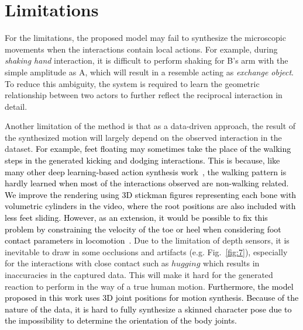 \documentclass[times,twocolumn,final]{elsarticle}
\begin{document}
\section{Limitations}
\label{sec:limitation}
For the limitations, the proposed model may fail to synthesize the microscopic movements when the interactions contain local actions. For example, during \emph{shaking hand} interaction, it is difficult to perform shaking for B's arm with the simple amplitude as A, which will result in a resemble acting as \emph{exchange object}. To reduce this ambiguity, the system is required to learn the geometric relationship between two actors to further reflect the reciprocal interaction in detail.

Another limitation of the method is that as a data-driven approach, the result of the synthesized motion will largely depend on the observed interaction in the dataset. \textcolor{black}{For example, feet floating may sometimes take the place of the walking steps in the generated kicking and dodging interactions. This is because, like many other deep learning-based action synthesis work~\cite{battan2021glocalnet,barsoum2018hp}, the walking pattern is hardly learned when most of the interactions observed are non-walking related. We improve the rendering using 3D stickman figures representing each bone with volumetric cylinders in the video, where the root positions are also included with less feet sliding. However, as an extension, it would be possible to fix this problem by constraining the velocity of the toe or heel when considering foot contact parameters in locomotion~\cite{holden2016deep}.} Due to the limitation of depth sensors, it is inevitable to draw in some occlusions and artifacts (e.g. Fig.~\ref{fig:7}), especially for the interactions with close contact such as $hugging$ which results in inaccuracies in the captured data. This will make it hard for the generated reaction to perform in the way of a true human motion. \textcolor{black}{Furthermore, the model proposed in this work uses 3D joint positions for motion synthesis. Because of the nature of the data, it is hard to fully synthesize a skinned character pose due to the impossibility to determine the orientation of the body joints. }
\end{document}
